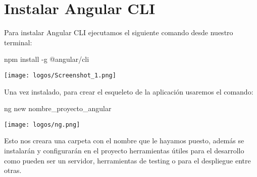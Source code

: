 \documentclass[openany]{book}
\begin{document}
\section{Instalar Angular CLI}
Para instalar Angular CLI ejecutamos el siguiente comando desde nuestro terminal:

\begin{center}
  npm install -g @angular/cli

  \texttt{[image: logos/Screenshot\_1.png]}
\end{center}

Una vez instalado, para crear el esqueleto de la aplicación usaremos el comando: 

\begin{center}
  ng new nombre_proyecto_angular

  \texttt{[image: logos/ng.png]}
\end{center}

Esto nos creara una carpeta con el nombre que le hayamos puesto, además se instalarán y configurarán en el proyecto herramientas útiles para el desarrollo como pueden ser un servidor, herramientas de testing o para el despliegue entre otras. 
\end{document}
